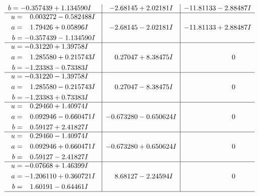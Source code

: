 \documentclass[1p]{elsarticle_modified}
\theoremstyle{definition}
\begin{document}
$$\begin{array}{c|c|c}
\begin{aligned}
b &= -0.357439 + 1.134590 I\end{aligned}
 & -2.68145 + 2.02181 I & -11.81133 - 2.88487 I \\ \hline\begin{aligned}
u &= \phantom{-}0.003272 - 0.582488 I \\
a &= \phantom{-}1.79426 + 0.05896 I \\
b &= -0.357439 - 1.134590 I\end{aligned}
 & -2.68145 - 2.02181 I & -11.81133 + 2.88487 I \\ \hline\begin{aligned}
u &= -0.31220 + 1.39758 I \\
a &= \phantom{-}1.285580 + 0.215743 I \\
b &= -1.23383 - 0.73383 I\end{aligned}
 & \phantom{-}0.27047 + 8.38475 I & \phantom{-0.000000 } 0 \\ \hline\begin{aligned}
u &= -0.31220 - 1.39758 I \\
a &= \phantom{-}1.285580 - 0.215743 I \\
b &= -1.23383 + 0.73383 I\end{aligned}
 & \phantom{-}0.27047 - 8.38475 I & \phantom{-0.000000 } 0 \\ \hline\begin{aligned}
u &= \phantom{-}0.29460 + 1.40974 I \\
a &= \phantom{-}0.092946 - 0.660471 I \\
b &= \phantom{-}0.59127 + 2.41827 I\end{aligned}
 & -0.673280 - 0.650624 I & \phantom{-0.000000 } 0 \\ \hline\begin{aligned}
u &= \phantom{-}0.29460 - 1.40974 I \\
a &= \phantom{-}0.092946 + 0.660471 I \\
b &= \phantom{-}0.59127 - 2.41827 I\end{aligned}
 & -0.673280 + 0.650624 I & \phantom{-0.000000 } 0 \\ \hline\begin{aligned}
u &= -0.07668 + 1.46399 I \\
a &= -1.206110 + 0.360721 I \\
b &= \phantom{-}1.60191 - 0.64461 I\end{aligned}
 & \phantom{-}8.68127 - 2.24594 I & \phantom{-0.000000 } 0\\
 \hline 
 \end{array}$$\newpage$$\begin{array}{c|c|c}  

\end{array}$$
\end{document}
